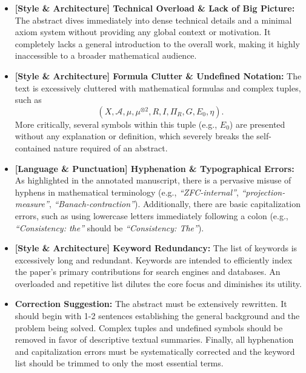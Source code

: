 \documentclass[11pt, a4paper]{article}
\begin{document}
\begin{itemize}
    \item \textcolor{RustOrange}{\textbf{[Style \& Architecture] Technical Overload \& Lack of Big Picture:}} The abstract dives immediately into dense technical details and a minimal axiom system without providing any global context or motivation. It completely lacks a general introduction to the overall work, making it highly inaccessible to a broader mathematical audience.

    \item \textcolor{RustOrange}{\textbf{[Style \& Architecture] Formula Clutter \& Undefined Notation:}} The text is excessively cluttered with mathematical formulas and complex tuples, such as \[(X, \mathcal{A}, \mu, \mu^{\otimes 2}, R, I, \Pi_R, G, E_0, \eta).\] More critically, several symbols within this tuple (e.g., $E_0$) are presented without any explanation or definition, which severely breaks the self-contained nature required of an abstract.

    \item \textcolor{NavyBlue}{\textbf{[Language \& Punctuation] Hyphenation \& Typographical Errors:}} As highlighted in the annotated manuscript, there is a pervasive misuse of hyphens in mathematical terminology (e.g., \textit{``ZFC-internal''}, \textit{``projection-measure''}, \textit{``Banach-contraction''}). Additionally, there are basic capitalization errors, such as using lowercase letters immediately following a colon (e.g., \textit{``Consistency: the''} should be \textit{``Consistency: The''}).
    
    \item \textcolor{RustOrange}{\textbf{[Style \& Architecture] Keyword Redundancy:}} The list of keywords is excessively long and redundant. Keywords are intended to efficiently index the paper's primary contributions for search engines and databases. An overloaded and repetitive list dilutes the core focus and diminishes its utility.

    \item \textbf{Correction Suggestion:} The abstract must be extensively rewritten. It should begin with 1-2 sentences establishing the general background and the problem being solved. Complex tuples and undefined symbols should be removed in favor of descriptive textual summaries. Finally, all hyphenation and capitalization errors must be systematically corrected and the keyword list should be trimmed to only the most essential terms.
\end{itemize}
\end{document}
